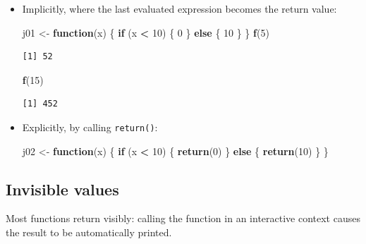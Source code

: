 \documentclass[]{book}
\newenvironment{Shaded}{\begin{snugshade}}{\end{snugshade}}
\newcommand{\ControlFlowTok}[1]{\textcolor[rgb]{0.13,0.29,0.53}{\textbf{#1}}}
\newcommand{\DecValTok}[1]{\textcolor[rgb]{0.00,0.00,0.81}{#1}}
\newcommand{\KeywordTok}[1]{\textcolor[rgb]{0.13,0.29,0.53}{\textbf{#1}}}
\newcommand{\NormalTok}[1]{#1}
\newcommand{\OperatorTok}[1]{\textcolor[rgb]{0.81,0.36,0.00}{\textbf{#1}}}
\newcommand{\StringTok}[1]{\textcolor[rgb]{0.31,0.60,0.02}{#1}}
\theoremstyle{definition}
\theoremstyle{definition}
\theoremstyle{definition}
\theoremstyle{remark}
\begin{document}
\begin{itemize}
\item
  Implicitly, where the last evaluated expression becomes the return
  value:

\begin{Shaded}
\begin{Highlighting}[]
\NormalTok{j01 <-}\StringTok{ }\ControlFlowTok{function}\NormalTok{(x) \{}
  \ControlFlowTok{if}\NormalTok{ (x }\OperatorTok{<}\StringTok{ }\DecValTok{10}\NormalTok{) \{}
    \DecValTok{0}
\NormalTok{  \} }\ControlFlowTok{else}\NormalTok{ \{}
    \DecValTok{10}
\NormalTok{  \}}
\NormalTok{\}}
\KeywordTok{f}\NormalTok{(}\DecValTok{5}\NormalTok{)}
\end{Highlighting}
\end{Shaded}

\begin{verbatim}
[1] 52
\end{verbatim}

\begin{Shaded}
\begin{Highlighting}[]
\KeywordTok{f}\NormalTok{(}\DecValTok{15}\NormalTok{)}
\end{Highlighting}
\end{Shaded}

\begin{verbatim}
[1] 452
\end{verbatim}
\item
  Explicitly, by calling \texttt{return()}:

\begin{Shaded}
\begin{Highlighting}[]
\NormalTok{j02 <-}\StringTok{ }\ControlFlowTok{function}\NormalTok{(x) \{}
  \ControlFlowTok{if}\NormalTok{ (x }\OperatorTok{<}\StringTok{ }\DecValTok{10}\NormalTok{) \{}
    \KeywordTok{return}\NormalTok{(}\DecValTok{0}\NormalTok{)}
\NormalTok{  \} }\ControlFlowTok{else}\NormalTok{ \{}
    \KeywordTok{return}\NormalTok{(}\DecValTok{10}\NormalTok{)}
\NormalTok{  \}}
\NormalTok{\}}
\end{Highlighting}
\end{Shaded}
\end{itemize}

\hypertarget{invisible-values}{%
\subsection{Invisible values}\label{invisible-values}}

Most functions return visibly: calling the function in an interactive
context causes the result to be automatically printed.
\end{document}
